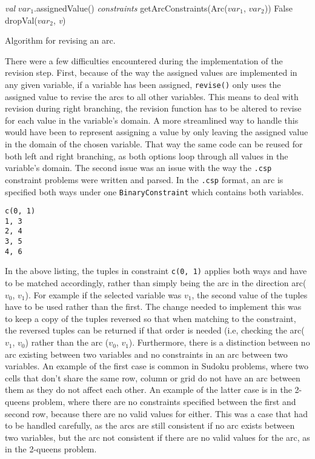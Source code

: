 \documentclass{article}
\begin{document}
\begin{algorithm}[H]
\begin{algorithmic}[1]
\State \textit{val} \gets $var_1$.assignedValue()
\State \textit{constraints} \gets getArcConstraints(Arc($var_1$, $var_2$))
	\Return False
\Else
				dropVal($var_2$, \textit{v})
			\EndIf
		\EndFor
	\EndFor
\EndIf
\EndProcedure
\end{algorithmic}
\caption{Algorithm for revising an arc.}
\end{algorithm}
There were a few difficulties encountered during the implementation of the revision step. First, because of the way the assigned values are implemented in any given variable, if a variable has been assigned, \texttt{revise()} only uses the assigned value to revise the arcs to all other variables. This means to deal with revision during right branching, the revision function has to be altered to revise for each value in the variable's domain. A more streamlined way to handle this would have been to represent assigning a value by only leaving the assigned value in the domain of the chosen variable. That way the same code can be reused for both left and right branching, as both options loop through all values in the variable's domain. The second issue was an issue with the way the \texttt{.csp} constraint problems were written and parsed. In the \texttt{.csp} format, an arc is specified both ways under one \texttt{BinaryConstraint} which contains both variables. 
\begin{lstlisting}[caption={Example of how constraints are specified in \texttt{.csp}}]
c(0, 1)
1, 3
2, 4
3, 5
4, 6
\end{lstlisting}
In the above listing, the tuples in constraint \texttt{c(0, 1)} applies both ways and have to be matched accordingly, rather than simply being the arc in the direction arc($v_0$, $v_1$). For example if the selected variable was $v_1$, the second value of the tuples have to be used rather than the first. The change needed to implement this was to keep a copy of the tuples reversed so that when matching to the constraint, the reversed tuples can be returned if that order is needed (i.e, checking the arc($v_1$, $v_0$) rather than the arc ($v_0$, $v_1$). 
\n
Furthermore, there is a distinction between no arc existing between two variables and no constraints in an arc between two variables. An example of the first case is common in Sudoku problems, where two cells that don't share the same row, column or grid do not have an arc between them as they do not affect each other. An example of the latter case is in the 2-queens problem, where there are no constraints specified between the first and second row, because there are no valid values for either. This was a case that had to be handled carefully, as the arcs are still consistent if no arc exists between two variables, but the arc not consistent if there are no valid values for the arc, as in the 2-queens problem. 
\end{document}
